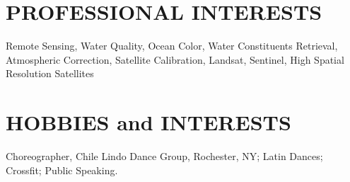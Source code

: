 \documentclass[11pt]{res} %
\begin{document}
\begin{resume}
\vspace{-0.1in}
\section{PROFESSIONAL INTERESTS}
\vspace{0.1in}
Remote Sensing, Water Quality, Ocean Color, Water Constituents Retrieval, Atmospheric Correction, Satellite Calibration, Landsat, Sentinel, High Spatial Resolution Satellites\\

\vspace{-0.1in}
\section{HOBBIES and INTERESTS}
\vspace{0.1in}
Choreographer, Chile Lindo Dance Group, Rochester, NY; Latin Dances; Crossfit; Public Speaking. \\

\end{resume}
\end{document}
